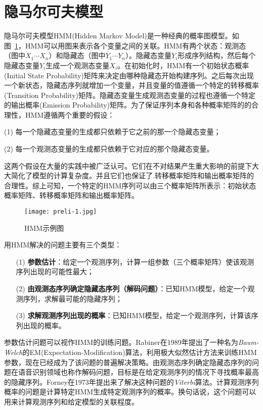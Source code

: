 \section{隐马尔可夫模型}

隐马尔可夫模型HMM(Hidden Markov Model)是一种经典的概率图模型。如图~\ref{fig:hmm}，HMM可以用图来表示各个变量之间的关联。HMM有两个状态：观测态（图中$X_1 \cdots X_n$）和隐藏态（图中$Y_1 \cdots Y_n$）。隐藏态变量$Y_i$形成序列结构，然后每个隐藏态变量$Y_i$生成一个观测态变量$X_i$。在初始化时，HMM有一个初始状态概率(Initial State Probability)矩阵来决定由哪种隐藏态开始构建序列。之后每次出现一个新状态，隐藏态序列就增加一个变量，并且变量的值遵循一个特定的转移概率(Transition Probability)矩阵。隐藏态变量生成观测态变量的过程也遵循一个特定的输出概率(Emission Probability)矩阵。为了保证序列本身和各种概率矩阵的的合理性，HMM遵循两个重要的假设：
\begin{enumerate*}		
	\item[(1)] 每一个隐藏态变量的生成都只依赖于它之前的那一个隐藏态变量；
	\item[(2)] 每一个观测态变量的生成都只依赖于它对应的那个隐藏态变量。
\end{enumerate*}
这两个假设在大量的实践中被广泛认可。它们在不对结果产生重大影响的前提下大大简化了模型的计算复杂度。并且它们也保证了.转移概率矩阵和输出概率矩阵的合理性。综上可知，一个特定的HMM序列可以由三个概率矩阵所表示：初始状态概率矩阵、转移概率矩阵和输出概率矩阵。

\begin{figure}[htbp]
	\centering
	\begin{minipage}[htbp]{0.6\textwidth}
		\centering
		\texttt{[image: preli-1.jpg]}
		\caption[HMM示例图]
		{HMM示例图\label{fig:hmm}}		
	\end{minipage}     
\end{figure}

用HMM解决的问题主要有三个类型：

\begin{enumerate}		
	\item[(1)] \textbf{参数估计}：给定一个观测序列，计算一组参数（三个概率矩阵）使该观测序列出现的可能性最大；
	\item[(2)] \textbf{由观测态序列确定隐藏态序列（解码问题）}：已知HMM模型，给定一个观测序列，求解最可能的隐藏序列；
	\item[(3)] \textbf{求解观测序列出现的概率}：已知HMM模型，给定一个观测序列，计算该序列出现的概率。
\end{enumerate}

参数估计问题可以视作HMM的训练问题。Rabiner在1989年提出了一种名为\emph{Baum-Welch}\cite{Rabiner:1989}的EM(Expectation-Modification)算法，利用极大似然估计方法来训练HMM参数，现在已经成为了该问题的普遍解决策略。由观测态序列确定隐藏态序列的问题在语音识别领域也称作解码问题，目标是在给定观测序列的情况下寻找概率最高的隐藏序列。Forney在1973年提出来了解决这种问题的\emph{Viterbi}\cite{Forney:1973}算法。计算观测序列概率的问题是计算特定HMM生成特定观测序列的概率。换句话说，这个问题可以用来计算观测序列和给定模型的关联程度。


